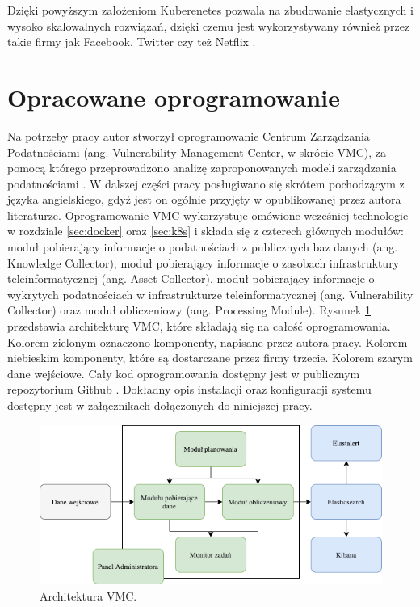 \bigbreak
Dzięki powyższym założeniom Kuberenetes pozwala na zbudowanie elastycznych i wysoko skalowalnych rozwiązań, dzięki czemu jest wykorzystywany również przez takie firmy jak Facebook, Twitter czy też Netflix \cite{vergilio2019non}.


\section{Opracowane oprogramowanie}
\label{sec:vmc}
Na potrzeby pracy autor stworzył oprogramowanie Centrum Zarządzania Podatnościami (ang. Vulnerability Management Center, w skrócie VMC), za pomocą którego przeprowadzono analizę zaproponowanych modeli zarządzania podatnościami \cite{vmcgithub}. W dalszej części pracy posługiwano się skrótem pochodzącym z języka angielskiego, gdyż jest on ogólnie przyjęty w opublikowanej przez autora literaturze. Oprogramowanie VMC wykorzystuje omówione wcześniej technologie w rozdziale \ref{sec:docker} oraz \ref{sec:k8s} i składa się z czterech głównych modułów: moduł pobierający informacje o podatnościach z publicznych baz danych (ang. Knowledge Collector), moduł pobierający informacje o zasobach infrastruktury teleinformatycznej (ang. Asset Collector), moduł pobierający informacje o wykrytych podatnościach w infrastrukturze teleinformatycznej (ang. Vulnerability Collector) oraz moduł obliczeniowy (ang. Processing Module). Rysunek \ref{fig:chapter3:vmc-arch} przedstawia architekturę VMC, które składają się na całość oprogramowania. Kolorem zielonym oznaczono komponenty, napisane przez autora pracy. Kolorem niebieskim komponenty, które są dostarczane przez firmy trzecie. Kolorem szarym dane wejściowe. Cały kod oprogramowania dostępny jest w publicznym repozytorium Github \cite{vmcgithub}. Dokładny opis instalacji oraz konfiguracji systemu dostępny jest w załącznikach dołączonych do niniejszej pracy.

\begin{figure}[!ht]
  \centering
  \includegraphics[width=.9\textwidth]{Chapters/Rozwiazanie/vmc/vmc-arch.png}
  \caption{Architektura VMC.}
  \label{fig:chapter3:vmc-arch}
\end{figure}


